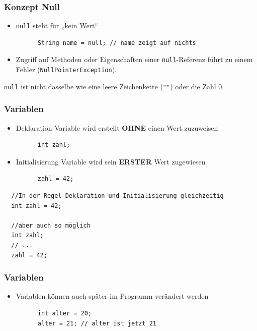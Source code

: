 \documentclass{../../presentation}
\begin{document}
\begin{frame}[fragile]
  \frametitle{Konzept Null}
  \pause
  \begin{itemize}
    \item \texttt{null} steht für „kein Wert“
          \begin{verbatim}
      String name = null; // name zeigt auf nichts
      \end{verbatim}
          \pause
    \item Zugriff auf Methoden oder Eigenschaften einer \texttt{null}-Referenz führt zu einem Fehler (\color{red}\texttt{NullPointerException}).
  \end{itemize}
  \pause
  \achtung{} \texttt{null} ist nicht dasselbe wie eine leere Zeichenkette (\texttt{""}) oder die Zahl 0.
\end{frame}

\begin{frame}[fragile]
  \frametitle{Variablen}
  \pause
  \begin{itemize}
    \item Deklaration \quad \textrightarrow \quad Variable wird erstellt \textbf{OHNE} einen Wert zuzuweisen
          \begin{verbatim}
      int zahl;
    \end{verbatim}
          \pause
    \item Initialisierung \quad \textrightarrow \quad Variable wird sein \textbf{ERSTER} Wert zugewiesen
          \begin{verbatim}
      zahl = 42;
    \end{verbatim}
          \pause
  \end{itemize}
  \begin{verbatim}
  //In der Regel Deklaration und Initialisierung gleichzeitig
  int zahl = 42;

  //aber auch so möglich
  int zahl;
  // ...
  zahl = 42;
  \end{verbatim}
\end{frame}

\begin{frame}[fragile]
  \frametitle{Variablen}
  \pause
  \begin{itemize}
    \item Variablen können auch später im Programm verändert werden
          \begin{verbatim}
      int alter = 20;
      alter = 21; // alter ist jetzt 21
    \end{verbatim}
  \end{itemize}
\end{frame}
\end{document}
